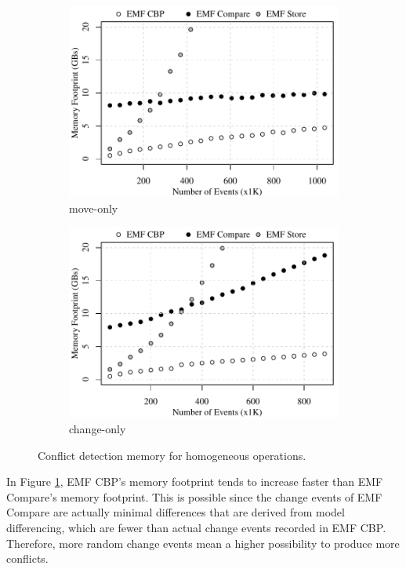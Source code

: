 \begin{figure}[ht]
\begin{subfigure}[t]{0.490\linewidth}
	\includegraphics[width=\linewidth]{move-conflict-memory-events}
	\caption{move-only}
	\label{fig:move-conflict-memory-events}
\end{subfigure}
\hfill
\begin{subfigure}[t]{0.490\linewidth}
	\includegraphics[width=\linewidth]{change-conflict-memory-events}
	\caption{change-only}
	\label{fig:change-conflict-memory-events}
\end{subfigure}
\caption{Conflict detection memory for homogeneous operations.}
\label{fig:homgeneous_operation_memory_events}
\end{figure}

In Figure \ref{fig:move-conflict-memory-events}, EMF CBP's memory footprint tends to increase faster than EMF Compare's memory footprint. This is possible since the change events of EMF Compare are actually minimal differences that are derived from model differencing, which are fewer than actual change events recorded in EMF CBP. Therefore, more random change events mean a higher possibility to produce more conflicts.

